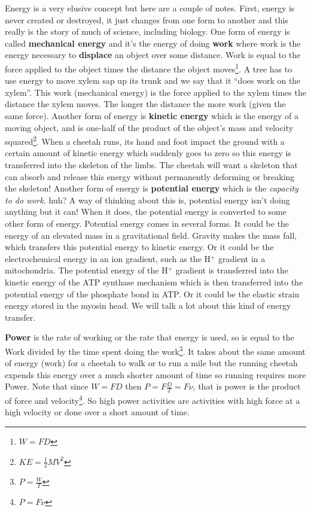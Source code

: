 \documentclass[]{book}
\let\rmarkdownfootnote\footnote%
\def\footnote{\protect\rmarkdownfootnote}
\begin{document}
Energy is a very elusive concept but here are a couple of notes. First,
energy is never created or destroyed, it just changes from one form to
another and this really is the story of much of science, including
biology. One form of energy is called \textbf{mechanical energy} and
it's the energy of doing \textbf{work} where work is the energy
necessary to \textbf{displace} an object over some distance. Work is
equal to the force applied to the object times the distance the object
moves\footnote{\(W=FD\)}. A tree has to use energy to move xylem sap up
its trunk and we say that it ``does work on the xylem''. This work
(mechanical energy) is the force applied to the xylem times the distance
the xylem moves. The longer the distance the more work (given the same
force). Another form of energy is \textbf{kinetic energy} which is the
energy of a moving object, and is one-half of the product of the
object's mass and velocity squared\footnote{\(KE = \frac{1}{2}MV^2\)}.
When a cheetah runs, its hand and foot impact the ground with a certain
amount of kinetic energy which suddenly goes to zero so this energy is
transferred into the skeleton of the limbs. The cheetah will want a
skeleton that can absorb and release this energy without permanently
deforming or breaking the skeleton! Another form of energy is
\textbf{potential energy} which is the \emph{capacity to do work}. huh?
A way of thinking about this is, potential energy isn't doing anything
but it can! When it does, the potential energy is converted to some
other form of energy. Potential energy comes in several forms. It could
be the energy of an elevated mass in a gravitational field. Gravity
makes the mass fall, which transfers this potential energy to kinetic
energy. Or it could be the electrochemical energy in an ion gradient,
such as the H\(^+\) gradient in a mitochondria. The potential energy of
the H\(^+\) gradient is transferred into the kinetic energy of the ATP
synthase mechanism which is then transferred into the potential energy
of the phosphate bond in ATP. Or it could be the elastic strain energy
stored in the myosin head. We will talk a lot about this kind of energy
transfer.

\textbf{Power} is the rate of working or the rate that energy is used,
so is equal to the Work divided by the time spent doing the
work\footnote{\(P=\frac{W}{T}\)}. It takes about the same amount of
energy (work) for a cheetah to walk or to run a mile but the running
cheetah expends this energy over a much shorter amount of time so
running requires more Power. Note that since \(W=FD\) then
\(P=F\frac{D}{T} = F\nu\), that is power is the product of force and
velocity\footnote{\(P=F\nu\)}. So high power activities are activities
with high force at a high velocity or done over a short amount of time.
\end{document}
